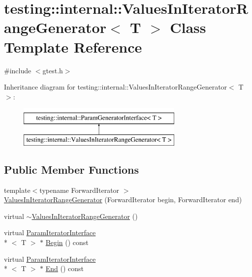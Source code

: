 \hypertarget{classtesting_1_1internal_1_1_values_in_iterator_range_generator}{\section{testing\-:\-:internal\-:\-:Values\-In\-Iterator\-Range\-Generator$<$ T $>$ Class Template Reference}
\label{classtesting_1_1internal_1_1_values_in_iterator_range_generator}
}


{\ttfamily \#include $<$gtest.\-h$>$}

Inheritance diagram for testing\-:\-:internal\-:\-:Values\-In\-Iterator\-Range\-Generator$<$ T $>$\-:\begin{figure}[H]
\begin{center}
\leavevmode
\includegraphics[height=2.000000cm]{classtesting_1_1internal_1_1_values_in_iterator_range_generator}
\end{center}
\end{figure}
\subsection*{Public Member Functions}
\begin{DoxyCompactItemize}
\item 
{\footnotesize template$<$typename Forward\-Iterator $>$ }\\\hyperlink{classtesting_1_1internal_1_1_values_in_iterator_range_generator_a8b30f6028bc5739bbd7c24b0f0e409f7}{Values\-In\-Iterator\-Range\-Generator} (Forward\-Iterator begin, Forward\-Iterator end)
\item 
virtual \hyperlink{classtesting_1_1internal_1_1_values_in_iterator_range_generator_ab921d9574baa83a8d081f05aa2ebeaa4}{$\sim$\-Values\-In\-Iterator\-Range\-Generator} ()
\item 
virtual \hyperlink{classtesting_1_1internal_1_1_param_iterator_interface}{Param\-Iterator\-Interface}\\*
$<$ T $>$ $\ast$ \hyperlink{classtesting_1_1internal_1_1_values_in_iterator_range_generator_a6e9c4b490d57e0ad0396b70d9a7854fd}{Begin} () const 
\item 
virtual \hyperlink{classtesting_1_1internal_1_1_param_iterator_interface}{Param\-Iterator\-Interface}\\*
$<$ T $>$ $\ast$ \hyperlink{classtesting_1_1internal_1_1_values_in_iterator_range_generator_aa838affa584afa9f91c44f9d1c0509c4}{End} () const 
\end{DoxyCompactItemize}

